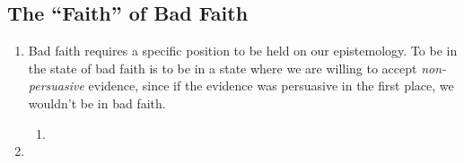 \subsection{The \enquote{Faith} of Bad Faith}

\begin{enumerate}
  \item Bad faith requires a specific position to be held on our epistemology. To be in the state of bad faith is to be in a state where we are willing to accept \emph{non-persuasive} evidence, since if the evidence was persuasive in the first place, we wouldn't be in bad faith.
  \begin{enumerate}
    \item {}
  \end{enumerate}
  \item {}
\end{enumerate}
